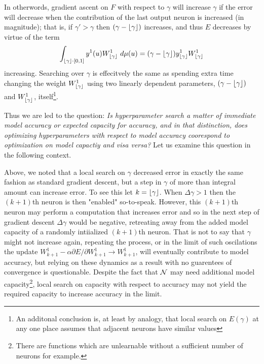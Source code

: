 \documentclass[12pt]{article}
\begin{document}
\begin{itemize}
{	In otherwords, gradient ascent on $F$ with respect to $\gamma$ will increase $\gamma$ if the error will decrease when the contribution of the last output neuron is increased (in magnitude); that is, if $\gamma' > \gamma$ then $(\gamma - \floor*{\gamma})$ increases, and thus $E$ decreases by virtue of the term 
	\begin{equation*}
		\int_{\floor*{\gamma}\cdot [0,1]} y^1(u) W^1_{\floor*{\gamma}}\ d\mu(u) = (\gamma - \floor*{\gamma}) y^1_{\floor*{\gamma}} W^1_{\floor*{\gamma}}
	\end{equation*} increasing. Searching over $\gamma$ is effecitvely the same as spending extra time changing the weight $W_{\floor*{\gamma}}^1$ using two linearly dependent parameters, $(\gamma - \floor*{\gamma})$ and $W_{\floor*{\gamma}}^1$, itself\footnote{An additonal conclusion is, at least by analogy, that local search on $E(\gamma)$ at any one place assumes that adjacent neurons have similar values }. 

	Thus we are led to the question: \emph{Is hyperparameter search a matter of immediate model accuracy or expected capacity for accuracy, and in that distinction, does optimizing hyperparameters with respect to model accuracy coorespond to optimization on model capactiy and visa versa?}  Let us examine this question in the following context. \

	Above, we noted that a local search on $\gamma$ decreased error in exactly the same fashion as standard gradient descent, but a step in $\gamma$ of more than integral amount can increase error. To see this let $k = \floor*{\gamma}$. When $\Delta \gamma > 1$ then the $(k+1)$th neuron is then "enabled" so-to-speak. However, this $(k+1)$th neuron may perform a computation that increases error and so in the next step of gradient descent $\Delta \gamma$ would be negative, retreating away from the added model capacity of a randomly intiialized $(k+1)$th neuron. That is not to say that $\gamma$ might not increase again, repeating the process, or in the limit of such oscilations the update $ W^1_{k+1} -\alpha\partial E/\partial W^1_{k+1} \to W^1_{k+1}$, will eventually contribute to model accuracy, but relying on these dynamics as a result with no guarentees of convergence is questionable. Despite the fact that $\scriptn$ may need additional model capacity\footnote{There are functions which are unlearnable without a sufficient number of neurons for example.}, local search on capacity with respect to accuracy may not yield the required capacity to increase accuracy in the limit.


}
\end{itemize}
\end{document}
